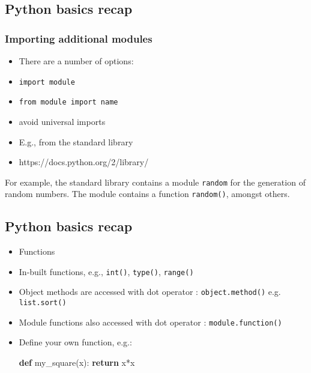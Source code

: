 \documentclass[11pt]{article}
\newenvironment{Shaded}{}{}
\newcommand{\KeywordTok}[1]{\textcolor[rgb]{0.00,0.44,0.13}{\textbf{{#1}}}}
\newcommand{\NormalTok}[1]{{#1}}
\newcommand{\ControlFlowTok}[1]{\textcolor[rgb]{0.00,0.44,0.13}{\textbf{{#1}}}}
\newcommand{\OperatorTok}[1]{\textcolor[rgb]{0.40,0.40,0.40}{{#1}}}
\begin{document}
    \subsection{Python basics recap}\label{python-basics-recap}

\subsubsection{Importing additional
modules}\label{importing-additional-modules}

\begin{itemize}
\item
  There are a number of options:
\item
  \texttt{import\ module}
\item
  \texttt{from\ module\ import\ name}
\item
  avoid universal imports
\item
  E.g., from the standard library
\item
  https://docs.python.org/2/library/
\end{itemize}

    For example, the standard library contains a module \texttt{random} for
the generation of random numbers. The module contains a function
\texttt{random()}, amongst others.

    \subsection{Python basics recap}\label{python-basics-recap}

\begin{itemize}
\item
  Functions
\item
  In-built functions, e.g., \texttt{int()}, \texttt{type()},
  \texttt{range()}
\item
  Object methods are accessed with dot operator :
  \texttt{object.method()} e.g. \texttt{list.sort()}
\item
  Module functions also accessed with dot operator :
  \texttt{module.function()}
\item
  Define your own function, e.g.:

\begin{Shaded}
\begin{Highlighting}[]
\KeywordTok{def} \NormalTok{my_square(x):}
    \ControlFlowTok{return} \NormalTok{x}\OperatorTok{*}\NormalTok{x}
\end{Highlighting}
\end{Shaded}
\end{itemize}
\end{document}

